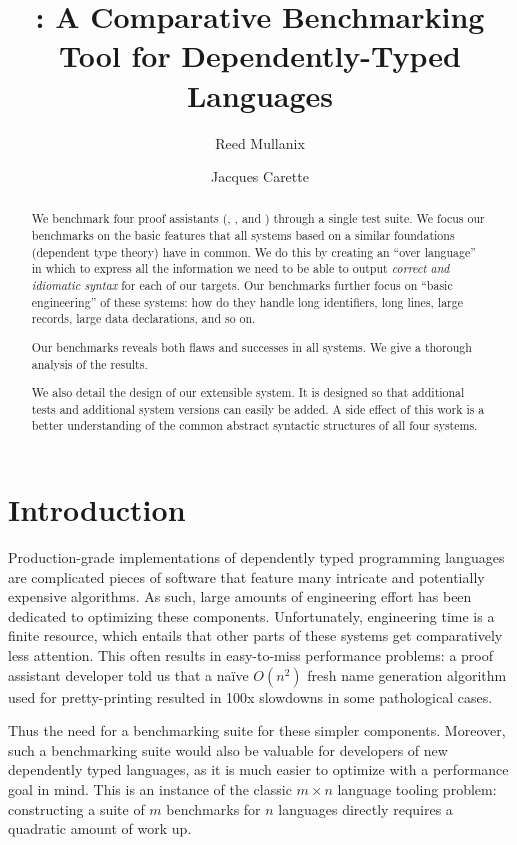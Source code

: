 \documentclass[a4paper,UKenglish,cleveref, autoref, thm-restate,anonymous]{lipics-v2021}
\title{\panbench: A Comparative Benchmarking Tool for Dependently-Typed Languages}
\author{Reed Mullanix}{Department of Computing and Software, McMaster University, Canada}{mullanir@mcmaster.ca}{https://orcid.org/0000-0002-7970-4961}{}
\author{Jacques Carette}{Department of Computing and Software, McMaster University, Canada}{carette@mcmaster.ca}{https://orcid.org/0000-0001-8993-9804}{}
\begin{document}
\maketitle

\begin{abstract}
We benchmark four proof assistants (\agda, \idris, \lean and \rocq) through a
single test suite. We focus our benchmarks on the basic features that all
systems based on a similar foundations (dependent type theory) have in common.
We do this by creating an ``over language'' in which to express all the
information we need to be able to output \emph{correct and idiomatic syntax}
for each of our targets. Our benchmarks further focus on ``basic engineering''
of these systems: how do they handle long identifiers, long lines, large
records, large data declarations, and so on.

Our benchmarks reveals both flaws and successes in all systems. We give a
thorough analysis of the results.

We also detail the design of our extensible system. It is designed so that
additional tests and additional system versions can easily be added. A side
effect of this work is a better understanding of the common abstract syntactic
structures of all four systems.
\end{abstract}

\section{Introduction}
\label{sec:intro}

Production-grade implementations of dependently typed programming languages
are complicated pieces of software that feature many intricate and potentially
expensive algorithms. As such, large amounts of engineering effort has been dedicated
to optimizing these components. Unfortunately, engineering time is a finite
resource, which entails that other parts of these systems
get comparatively less attention. This often results in easy-to-miss performance problems:
a proof assistant developer told us that a na\"ive \(O(n^{2})\)
fresh name generation algorithm used for pretty-printing resulted in 100x slowdowns
in some pathological cases.

Thus the need for a benchmarking suite for these simpler components.  Moreover, such
a benchmarking suite would also be valuable for developers of new dependently typed
languages, as it is much easier to optimize with a performance goal in mind. This
is an instance of the classic \(m \times n\) language tooling problem: constructing
a suite of \(m\) benchmarks for \(n\) languages directly requires a quadratic
amount of work up.
\end{document}
